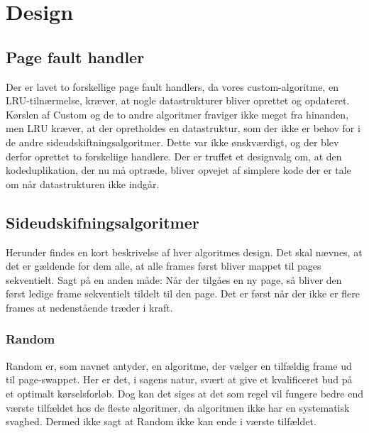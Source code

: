 \section{Design}
\label{sec:design}

\subsection{Page fault handler}
Der er lavet to forskellige page fault handlers, da vores custom-algoritme, en LRU-tilnærmelse, kræver, at nogle datastrukturer bliver oprettet og opdateret. Kørslen af Custom og de to andre algoritmer fraviger ikke meget fra hinanden, men LRU kræver, at der opretholdes en datastruktur, som der ikke er behov for i de andre sideudskiftningsalgoritmer. Dette var ikke ønskværdigt, og der blev derfor oprettet to forskeliige handlere. Der er truffet et designvalg om, at den kodeduplikation, der nu må optræde, bliver opvejet af simplere kode der er tale om når datastrukturen ikke indgår.  

\subsection{Sideudskifningsalgoritmer}
Herunder findes en kort beskrivelse af hver algoritmes design. Det skal nævnes, at det er gældende for dem alle, at alle frames først bliver mappet til pages sekventielt. Sagt på en anden måde: Når der tilgåes en ny page, så bliver den først ledige frame sekventielt tildelt til den page. Det er først når der ikke er flere frames at nedenstående træder i kraft.

	\subsubsection{Random}
	Random er, som navnet antyder, en algoritme, der vælger en tilfældig frame ud til page-swappet. Her er det, i sagens natur, svært at give et kvalificeret bud på et optimalt kørselsforløb. Dog kan det siges at det som regel vil fungere bedre end værste tilfældet hos de fleste algoritmer, da algoritmen ikke har en systematisk svaghed. Dermed ikke sagt at Random ikke kan ende i værste tilfældet. 
	
